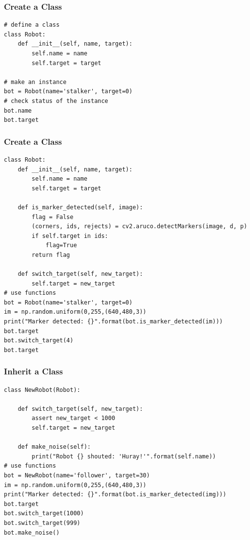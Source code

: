 \documentclass[12pt,letterpaper]{beamer}
\begin{document}
\begin{frame}[fragile]
    \frametitle{Create a Class}

    {\scriptsize
    \begin{verbatim}
# define a class
class Robot:
    def __init__(self, name, target):
        self.name = name
        self.target = target

# make an instance
bot = Robot(name='stalker', target=0)
# check status of the instance 
bot.name
bot.target
    \end{verbatim}
    }
\end{frame}

\begin{frame}[fragile]
    \frametitle{Create a Class}

    {\scriptsize
    \begin{verbatim}
class Robot:
    def __init__(self, name, target):
        self.name = name
        self.target = target

    def is_marker_detected(self, image):
        flag = False
        (corners, ids, rejects) = cv2.aruco.detectMarkers(image, d, p)
        if self.target in ids:
            flag=True
        return flag
            
    def switch_target(self, new_target):
        self.target = new_target
# use functions 
bot = Robot(name='stalker', target=0)
im = np.random.uniform(0,255,(640,480,3))
print("Marker detected: {}".format(bot.is_marker_detected(im)))
bot.target
bot.switch_target(4)
bot.target
    \end{verbatim}
    }
\end{frame}

\begin{frame}[fragile]
    \frametitle{Inherit a Class}

    {\scriptsize
    \begin{verbatim}
class NewRobot(Robot):

    def switch_target(self, new_target):
        assert new_target < 1000
        self.target = new_target

    def make_noise(self):
        print("Robot {} shouted: 'Huray!'".format(self.name))
# use functions 
bot = NewRobot(name='follower', target=30)
im = np.random.uniform(0,255,(640,480,3))
print("Marker detected: {}".format(bot.is_marker_detected(img)))
bot.target
bot.switch_target(1000)
bot.switch_target(999)
bot.make_noise()
    \end{verbatim}
    }
\end{frame}
\end{document}
